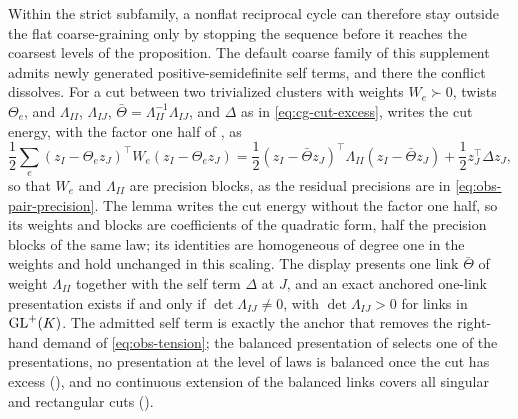 \medskip
Within the strict subfamily, a nonflat reciprocal cycle can therefore stay outside the flat
coarse-graining only by stopping the sequence before it reaches the coarsest levels of the
proposition. The default coarse family of this supplement admits newly generated
positive-semidefinite self terms, and there the conflict dissolves. For a cut between two
trivialized clusters with weights \(W_e\succ0\), twists \(\Theta_e\), and \(\Lambda_{II}\), \(\Lambda_{IJ}\),
\(\bar\Theta=\Lambda_{II}^{-1}\Lambda_{IJ}\), and \(\Delta\) as in \eqref{eq:cg-cut-excess},  writes the cut
energy, with the factor one half of , as
\begin{equation}
\frac12\sum_e(z_I-\Theta_ez_J)^{\top}W_e(z_I-\Theta_ez_J)
=\frac12(z_I-\bar\Theta z_J)^{\top}\Lambda_{II}(z_I-\bar\Theta z_J)+\frac12z_J^{\top}\Delta z_J ,
\label{eq:obs-cut-completed-square}
\end{equation}
so that \(W_e\) and \(\Lambda_{II}\) are precision blocks, as the residual precisions are in
\eqref{eq:obs-pair-precision}. The lemma writes the cut energy without the factor one half, so its
weights and blocks are coefficients of the quadratic form, half the precision blocks of the same law;
its identities are homogeneous of degree one in the weights and hold unchanged in this scaling.
The display presents
one link \(\bar\Theta\) of weight \(\Lambda_{II}\) together with the self term \(\Delta\) at \(J\), and an exact
anchored one-link presentation exists if and only if \(\det\Lambda_{IJ}\neq0\), with \(\det\Lambda_{IJ}>0\) for
links in \(\mathrm{GL}^+(K)\). The admitted self term is exactly the anchor that removes the
right-hand demand of \eqref{eq:obs-tension}; the balanced presentation of
 selects one of the presentations, no presentation at the
level of laws is balanced once the cut has excess (), and
no continuous extension of the balanced links covers all singular and rectangular cuts
().
